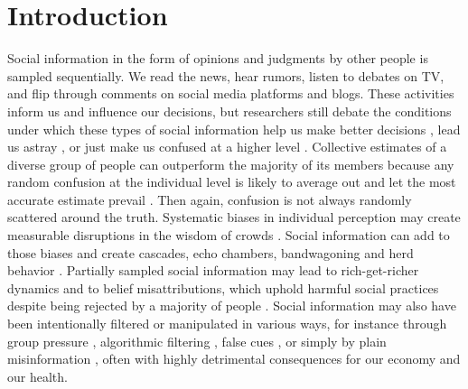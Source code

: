 \documentclass[10pt,a4paper,twocolumn,lineno]{article}
\begin{document}
\section{Introduction}
\noindent
Social information in the form of opinions and judgments by other people is sampled sequentially. We read the news, hear rumors, listen to debates on TV, and flip through comments on social media platforms and blogs. These activities inform us and influence our decisions, but researchers still debate the conditions under which these types of social information help us make better decisions \cite{woolley2010evidence, gurccay2015power, becker2017network, jayles2017social}, lead us astray \cite{caplan2011myth, lorenz2011social, minson2012cost, king2011true, le2018endogenous}, or just make us confused at a higher level \cite{salganik2006experimental, salganik2009web}. Collective estimates of a diverse group of people can outperform the majority of its members because any random confusion at the individual level is likely to average out and let the most accurate estimate prevail \cite{galton1907vox, muth1961rational, surowiecki2005wisdom, hong2008some}. Then again, confusion is not always randomly scattered around the truth. Systematic biases in individual perception may create measurable disruptions in the wisdom of crowds \cite{izard2008calibrating, nash2014curious, kao2018counteracting}. Social information can add to those biases and create cascades, echo chambers, bandwagoning and herd behavior \cite{anderson1997information, bikhchandani1992theory, bakshy2015exposure, banerjee1992simple}. Partially sampled social information may lead to rich-get-richer dynamics \cite{barabasi1999emergence} and to belief misattributions, which uphold harmful social practices despite being rejected by a majority of people \cite{katz1931students, darley1968bystander, ross1977false, noelle1974spiral, lee2019homophily}. Social information may also have been intentionally filtered or manipulated in various ways, for instance through group pressure \cite{asch1951effects}, algorithmic filtering \cite{pariser2011filter}, false cues \cite{salganik2006experimental, muchnik2013social, hanson1996hits}, or simply by plain misinformation \cite{hendricks2018reality}, often with highly detrimental consequences for our economy and our health.

\end{document}

